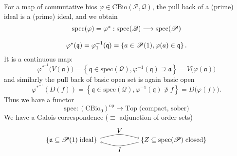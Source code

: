 \documentclass[leqno]{article}
\renewcommand{\top}{\text{Top}}
\newcommand{\oneideal}{\mathfrak{a}}
\newcommand{\biop}{\mathscr{P}}
\newcommand{\bioq}{\mathscr{Q}}
\numberwithin{equation}{section}
\begin{document}
For a map of commutative bios $\varphi\in \text{CBio}(\biop,\bioq)$, the pull back of a
(prime) ideal is a (prime) ideal, and we obtain
\begin{equation}
				\begin{array}[H]{c}
				\text{spec}(\varphi)=\varphi^{\ast}: \text{spec}(\bioq)\longrightarrow
				\text{spec}(\biop) \\\\
				\varphi^{\ast}(\mathfrak{q})=\varphi_{1}^{-1}(\mathfrak{q})=\left\{
				a\in\biop(1),\varphi(a)\in \mathfrak{q} \right\}.
				\end{array}
				\label{eq:5.6}
\end{equation}
It is a continuous map: 
\begin{equation}
				\varphi^{\ast^{-1}}\big(V(\oneideal)\big) = \left\{ \mathfrak{q}\in
				\text{spec}(\bioq),\varphi^{-1}(\mathfrak{q})\supseteq \oneideal \right\} =
				V\big(\varphi(\oneideal)\big)
				\label{eq:5.7}
\end{equation}
and similarly the pull back of basic open set is again basic open 
\begin{equation}
				\varphi^{\ast^{-1}}\left( D(f) \right) = \left\{ \mathfrak{q}\in \text{spec}(\bioq),
				\varphi^{-1}(\mathfrak{q})\not\ni f \right\} = D\big(\varphi(f)\big). 
				\label{eq:5.8}
\end{equation}
Thus we have a functor 
\begin{equation}
				\text{spec}: (\text{CBio}_0)^{\text{op}} \longrightarrow \top \;
				\text{(compact, sober)}
				\label{eq:5.9}
\end{equation}
We have a Galois correspondence ($\equiv$ adjunction of order sets)
\begin{equation}
				\begin{tikzpicture}[baseline=5mm]
								 \node at (0mm,5mm) {$\left\{ \oneideal \subseteq \biop(1)\;\text{ideal} \right\}$};
								 \draw[->] plot[smooth ] coordinates {(15mm,6mm)(25mm,8mm)(35mm,6mm)};
								 \draw[<-] plot[smooth ] coordinates {(15mm,4mm)(25mm,2mm)(35mm,4mm)};
								 \node at (25mm,10mm) {$V$};
								 \node at (25mm,0mm) {$I$};
								 \node at (53mm,5mm) {$\left\{ Z\subseteq \text{spec}(\biop)\;\text{closed} \right\}$};
				\end{tikzpicture}
				\label{eq:5.10}
\end{equation}
\end{document}
